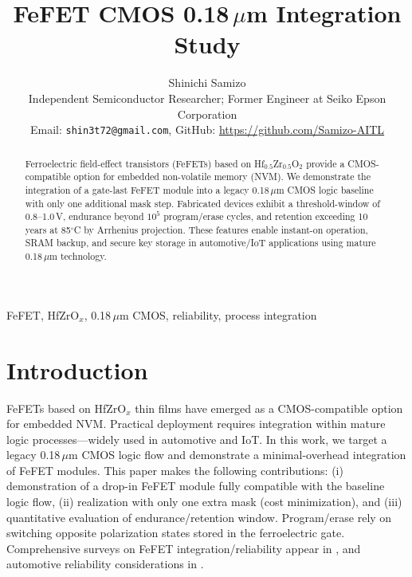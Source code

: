 \documentclass[journal]{IEEEtran}
\begin{document}
\title{FeFET CMOS 0.18\,$\mu$m Integration Study}
\author{Shinichi Samizo\\
\small Independent Semiconductor Researcher; Former Engineer at Seiko Epson Corporation\\
\small Email: \texttt{shin3t72@gmail.com}, GitHub: \url{https://github.com/Samizo-AITL}}
\maketitle

\begin{abstract}
Ferroelectric field-effect transistors (FeFETs) based on Hf$_{0.5}$Zr$_{0.5}$O$_2$ provide a CMOS-compatible option for embedded non-volatile memory (NVM). We demonstrate the integration of a gate-last FeFET module into a legacy 0.18\,$\mu$m CMOS logic baseline with only one additional mask step. Fabricated devices exhibit a threshold-window of 0.8–1.0\,V, endurance beyond $10^5$ program/erase cycles, and retention exceeding 10 years at 85$^\circ$C by Arrhenius projection. These features enable instant-on operation, SRAM backup, and secure key storage in automotive/IoT applications using mature 0.18\,$\mu$m technology.
\end{abstract}

\begin{IEEEkeywords}
FeFET, HfZrO$_x$, 0.18\,$\mu$m CMOS, reliability, process integration
\end{IEEEkeywords}

\section{Introduction}
FeFETs based on HfZrO$_x$ thin films have emerged as a CMOS-compatible option for embedded NVM. Practical deployment requires integration within mature logic processes—widely used in automotive and IoT. In this work, we target a legacy 0.18\,$\mu$m CMOS logic flow and demonstrate a minimal-overhead integration of FeFET modules. This paper makes the following contributions: (i) demonstration of a drop-in FeFET module fully compatible with the baseline logic flow, (ii) realization with only one extra mask (cost minimization), and (iii) quantitative evaluation of endurance/retention window. Program/erase rely on switching opposite polarization states stored in the ferroelectric gate. Comprehensive surveys on FeFET integration/reliability appear in \cite{boscke2011,muller2012,schenk2019}, and automotive reliability considerations in \cite{nakamura2003}.
\end{document}
